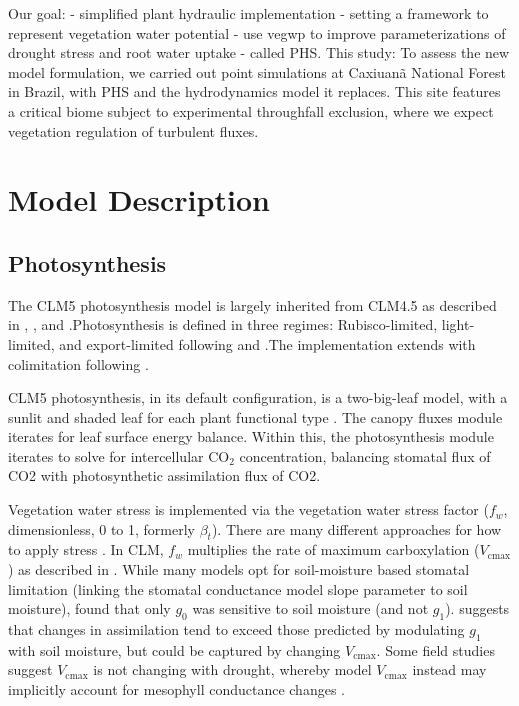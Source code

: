 \documentclass[draft,linenumbers]{agujournal}
\begin{document}
Our goal:
  - simplified plant hydraulic implementation
  - setting a framework to represent vegetation water potential
  - use vegwp to improve parameterizations of drought stress and root water uptake
  - called PHS.
This study:
To assess the new model formulation, we carried out point simulations at Caxiuan\~a National Forest in Brazil, 
with PHS and the hydrodynamics model it replaces. 
This site features a critical biome subject to experimental throughfall exclusion, where we expect vegetation regulation of turbulent fluxes.



\section{Model Description}

\subsection{Photosynthesis}
\label{sect:A}
    The CLM5 photosynthesis model is largely inherited from CLM4.5 as described in \citet{bonan2011}, \citet{thornton2007},
    and \citet{oleson2013}.Photosynthesis is defined in three regimes: Rubisco-limited, light-limited, and export-limited 
    following \citet{farquhar1980} and \citet{harley1992}.The implementation extends \citet{sellers1996a,sellers1996b} with 
    colimitation following \citet{collatz1991}. 
    
    CLM5 photosynthesis, in its default configuration, is a two-big-leaf model, with a sunlit and shaded leaf for each plant functional type \citep{thornton2007, dai2004, oleson2013}. 
    The canopy fluxes module iterates for leaf surface energy balance.
    Within this, the photosynthesis module iterates to solve for intercellular CO$_2$ concentration, balancing stomatal flux of 
    CO2 with photosynthetic assimilation flux of CO2.
    
    Vegetation water stress is implemented via the vegetation water stress factor ($f_w$, dimensionless, 0 to 1, formerly $\beta_t$). 
    There are many different approaches for how to apply stress \citep{zhou2013,novick2016a,sperry2015}.
    In CLM, $f_w$ multiplies the rate of maximum carboxylation ($V_{\text{cmax}}$) as described in \citet{oleson2013}.
    While many models opt for soil-moisture based stomatal limitation (linking the stomatal conductance model slope parameter to soil moisture),
    \cite{lin2018} found that only $g_0$ was sensitive to soil moisture (and not $g_1$).
    \cite{zhou2013} suggests that changes in assimilation tend to exceed those predicted by modulating $g_1$ with soil moisture, but could be captured by changing $V_{\text{cmax}}$.
    Some field studies suggest $V_{\text{cmax}}$ is not changing with drought, whereby model $V_{\text{cmax}}$ instead may implicitly account for mesophyll conductance changes \citep{flexas2004}.
    
\end{document}
